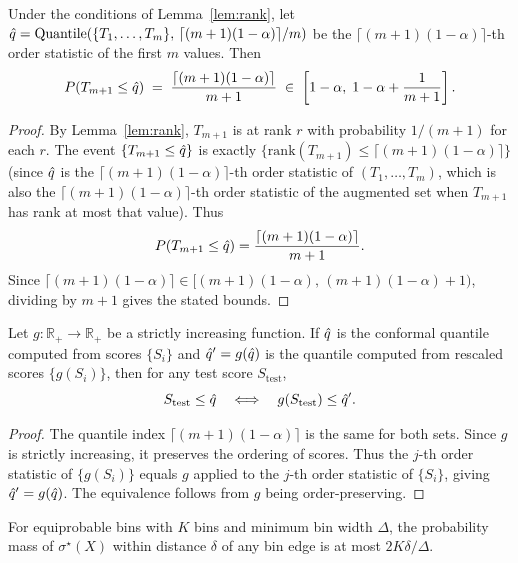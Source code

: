 \begin{lemma}
\label{lem:cp_quantile}
Under the conditions of Lemma~\ref{lem:rank}, let $\hat{q} = \mathrm{Quantile}(\{T_1, \ldots, T_m\},\, \lceil (m+1)(1-\alpha) \rceil / m)$ be the $\lceil (m+1)(1-\alpha)\rceil$-th order statistic of the first $m$ values. Then
\[
P(T_{m+1} \leq \hat{q}) \;=\; \frac{\lceil (m+1)(1-\alpha) \rceil}{m+1} \;\in\; \left[1 - \alpha,\; 1 - \alpha + \frac{1}{m+1}\right].
\]
\end{lemma}

\begin{proof}
By Lemma~\ref{lem:rank}, $T_{m+1}$ is at rank $r$ with probability $1/(m+1)$ for each $r$. The event $\{T_{m+1} \leq \hat{q}\}$ is exactly $\{\mathrm{rank}(T_{m+1}) \leq \lceil (m+1)(1-\alpha)\rceil\}$ (since $\hat{q}$ is the $\lceil (m+1)(1-\alpha)\rceil$-th order statistic of $(T_1, \ldots, T_m)$, which is also the $\lceil (m+1)(1-\alpha)\rceil$-th order statistic of the augmented set when $T_{m+1}$ has rank at most that value). Thus
\[
P(T_{m+1} \leq \hat{q}) = \frac{\lceil (m+1)(1-\alpha)\rceil}{m+1}.
\]
Since $\lceil (m+1)(1-\alpha)\rceil \in [(m+1)(1-\alpha),\, (m+1)(1-\alpha) + 1)$, dividing by $m+1$ gives the stated bounds.
\end{proof}

\begin{lemma}
\label{lem:rescaling}
Let $g : \mathbb{R}_+ \to \mathbb{R}_+$ be a strictly increasing function. If $\hat{q}$ is the conformal quantile computed from scores $\{S_i\}$ and $\hat{q}' = g(\hat{q})$ is the quantile computed from rescaled scores $\{g(S_i)\}$, then for any test score $S_{\mathrm{test}}$,
\[
S_{\mathrm{test}} \leq \hat{q} \quad\Longleftrightarrow\quad g(S_{\mathrm{test}}) \leq \hat{q}'.
\]
\end{lemma}

\begin{proof}
The quantile index $\lceil (m+1)(1-\alpha)\rceil$ is the same for both sets. Since $g$ is strictly increasing, it preserves the ordering of scores. Thus the $j$-th order statistic of $\{g(S_i)\}$ equals $g$ applied to the $j$-th order statistic of $\{S_i\}$, giving $\hat{q}' = g(\hat{q})$. The equivalence follows from $g$ being order-preserving.
\end{proof}

\begin{lemma}
\label{lem:bin_boundary}
For equiprobable bins with $K$ bins and minimum bin width $\Delta$, the probability mass of $\sigma^\star(X)$ within distance $\delta$ of any bin edge is at most $2K\delta / \Delta$.
\end{lemma}

